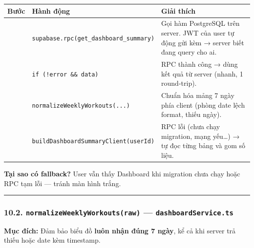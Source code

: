 \documentclass[12pt,a4paper]{article}
\newcounter{none}
\begin{document}
{\def\LTcaptype{none} %
\begin{longtable}[]{@{}
  >{\raggedright\arraybackslash}p{}
  >{\raggedright\arraybackslash}p{}
  >{\raggedright\arraybackslash}p{}@{}}
\toprule\noalign{}
\begin{minipage}[b]{\linewidth}\raggedright
Bước
\end{minipage} & \begin{minipage}[b]{\linewidth}\raggedright
Hành động
\end{minipage} & \begin{minipage}[b]{\linewidth}\raggedright
Giải thích
\end{minipage} \\
\midrule\noalign{}
\endhead
\bottomrule\noalign{}
\endlastfoot
1 &
\texttt{supabase.rpc(\textquotesingle{}get\_dashboard\_summary\textquotesingle{})}
& Gọi hàm PostgreSQL trên server. JWT của user tự động gửi kèm → server
biết đang query cho ai. \\
2 & \texttt{if\ (!error\ \&\&\ data)} & RPC thành công → dùng kết quả từ
server (nhanh, 1 round-trip). \\
3 & \texttt{normalizeWeeklyWorkouts(...)} & Chuẩn hóa mảng 7 ngày phía
client (phòng date lệch format, thiếu ngày). \\
4 & \texttt{buildDashboardSummaryClient(userId)} & RPC lỗi (chưa chạy
migration, mạng yếu\ldots) → tự đọc từng bảng và gom số liệu. \\
\end{longtable}
}

\textbf{Tại sao có fallback?} User vẫn thấy Dashboard khi migration chưa
chạy hoặc RPC tạm lỗi --- tránh màn hình trắng.

\begin{center}\rule{0.5\linewidth}{0.5pt}\end{center}

\subsubsection{\texorpdfstring{10.2.
\texttt{normalizeWeeklyWorkouts(raw)} ---
\texttt{dashboardService.ts}}{10.2. normalizeWeeklyWorkouts(raw) --- dashboardService.ts}}\label{normalizeweeklyworkoutsraw-dashboardservice.ts}

\textbf{Mục đích:} Đảm bảo biểu đồ \textbf{luôn nhận đúng 7 ngày}, kể cả
khi server trả thiếu hoặc date kèm timestamp.
\end{document}
